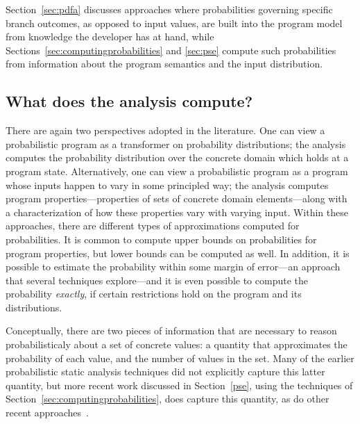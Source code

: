 Section~\ref{sec:pdfa} discusses approaches where probabilities
governing specific branch outcomes, as opposed to input values,
are built into the program model from knowledge the developer
has at hand, while Sections~\ref{sec:computingprobabilities}
and \ref{sec:pse} compute such probabilities from information about
the program semantics and the input distribution.

\subsection{What does the analysis compute?}
There are again two perspectives adopted in the literature.
One can view a probabilistic program as a transformer on probability
distributions; the analysis computes the probability distribution over the
concrete domain which holds at a program state.
Alternatively, one can view a probabilistic program as a program 
whose inputs happen
to vary in some principled way; the analysis computes program 
properties---properties of sets of concrete domain elements---along with a characterization
of how these properties vary with varying input.
Within these approaches, there are different types of approximations
computed for probabilities.  It is common to compute upper bounds
on probabilities for program properties, but lower bounds can 
be computed as well.  In addition, it is possible to estimate the
probability within some margin of error---an approach that several
techniques explore---and it is even possible to compute the probability
\textit{exactly}, if certain restrictions hold on the program and its distributions.

Conceptually, there are two pieces of information that are necessary
to reason probabilisticaly about a set of concrete values: a quantity
that approximates the probability of each value, and the number of
values in the set.  Many of the earlier probabilistic static analysis
techniques did not explicitly capture this latter quantity, but
more recent work discussed in Section~\ref{pse}, using the
techniques of Section~\ref{sec:computingprobabilities}, 
does capture this quantity, as do other
recent approaches~\cite{probablisticPolyhedra}.




